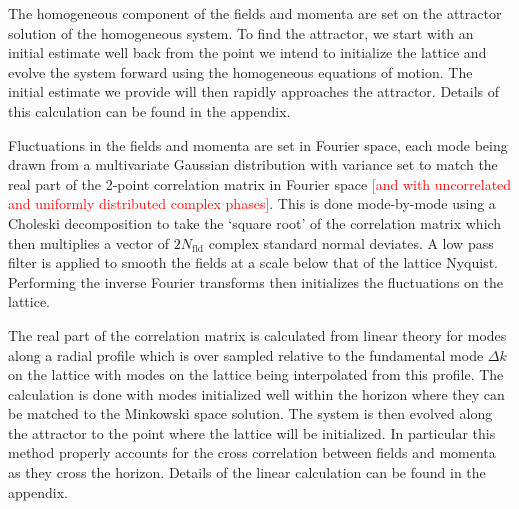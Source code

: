 The homogeneous component of the fields and momenta are set on the attractor solution of the homogeneous system. To find the attractor, we start with an initial estimate well back from the point we intend to initialize the lattice and evolve the system forward using the homogeneous equations of motion. The initial estimate we provide will then rapidly approaches the attractor. Details of this calculation can be found in the appendix. 

Fluctuations in the fields and momenta are set in Fourier space, each mode being drawn from a multivariate Gaussian distribution with variance set to match the real part of the 2-point correlation matrix in Fourier space \textcolor{red}{[and with uncorrelated and uniformly distributed complex phases]}. This is done mode-by-mode using a Choleski decomposition to take the `square root' of the correlation matrix which then multiplies a vector of $2N_\mathrm{fld}$ complex standard normal deviates. A low pass filter is applied to smooth the fields at a scale below that of the lattice Nyquist. Performing the inverse Fourier transforms then initializes the fluctuations on the lattice.

The real part of the correlation matrix is calculated from linear theory for modes along a radial profile which is over sampled relative to the fundamental mode $\Delta k$ on the lattice with modes on the lattice being interpolated from this profile. The calculation is done with modes initialized well within the horizon where they can be matched to the Minkowski space solution. The system is then evolved along the attractor to the point where the lattice will be initialized. In particular this method properly accounts for the cross correlation between fields and momenta as they cross the horizon. Details of the linear calculation can be found in the appendix.


